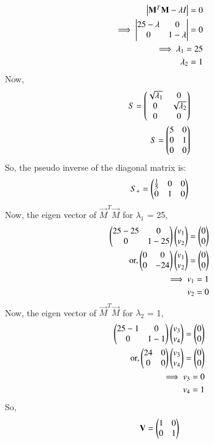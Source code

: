 \documentclass[journal,12pt,twocolumn]{IEEEtran}
\begin{document}
\begin{align}
\begin{vmatrix}\mathbf{M}^T \mathbf{M} - \lambda I\end{vmatrix} = 0\\
\implies \begin{vmatrix}25-\lambda & 0\\0 & 1-\lambda\end{vmatrix} = 0\\
\implies \lambda_1 = 25\\
\lambda_2 = 1
\end{align}
Now,
\begin{align}
S= \begin{pmatrix}\sqrt{\lambda_1} & 0\\0 & \sqrt{\lambda_2}\\0 & 0\end{pmatrix}\\
S= \begin{pmatrix}5 & 0\\0 & 1\\0 & 0\end{pmatrix}
\end{align}
So, the pseudo inverse of the diagonal matrix is:
\begin{align}
S_+= \begin{pmatrix}\frac{1}{5} & 0 & 0\\0 & 1 & 0\end{pmatrix}
\end{align}
Now, the eigen vector of $\vec{M}^T \vec{M}$ for $\lambda_1$ = 25,
\begin{align}
\begin{pmatrix}25-25 & 0\\0 & 1-25\end{pmatrix} \begin{pmatrix}v_1\\v_2\end{pmatrix} = \begin{pmatrix}0\\0\end{pmatrix}\\
\text{or,} \begin{pmatrix}0 & 0\\0 & -24\end{pmatrix} \begin{pmatrix}v_1\\v_2\end{pmatrix} = \begin{pmatrix}0\\0\end{pmatrix}\\
\implies v_1 = 1\\
v_2 = 0
\end{align}
Now, the eigen vector of $\vec{M}^T \vec{M}$ for $\lambda_2$ = 1,
\begin{align}
\begin{pmatrix}25-1& 0\\0 & 1-1\end{pmatrix} \begin{pmatrix}v_3\\v_4\end{pmatrix} = \begin{pmatrix}0\\0\end{pmatrix}\\
\text{or,} \begin{pmatrix}24 & 0\\0 & 0\end{pmatrix} \begin{pmatrix}v_3\\v_4\end{pmatrix} = \begin{pmatrix}0\\0\end{pmatrix}\\
\implies v_3 = 0\\
v_4 = 1
\end{align}
So,
\begin{align}
\mathbf{V} = \begin{pmatrix}1 & 0\\0 & 1\end{pmatrix}
\end{align}
\end{document}
